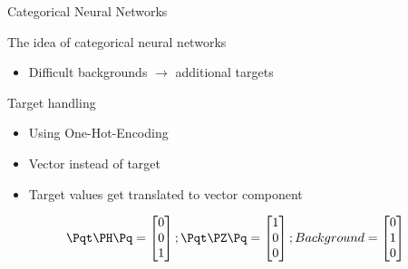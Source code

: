 \begin{frame}
    \begin{center}
        \Huge Categorical Neural Networks
    \end{center}
\end{frame}

\begin{frame}{The idea of categorical neural networks}
    \begin{itemize}
        \item \Large Difficult backgrounds $\rightarrow$ additional targets
    \end{itemize}
\end{frame}

\begin{frame}{Target handling}
    \begin{itemize}
        \item Using One-Hot-Encoding
        \item Vector instead of target
        \item Target values get translated to vector component
    \end{itemize}
    \vspace{0.2cm}
    \begin{equation*}
    \tHq = \begin{bmatrix}
           0 \\
           0 \\
           1
         \end{bmatrix};
    \tZq = \begin{bmatrix}
           1 \\
           0 \\
           0
         \end{bmatrix};
    Background = \begin{bmatrix}
           0 \\
           1 \\
           0
         \end{bmatrix}
    \end{equation*}
\end{frame}

